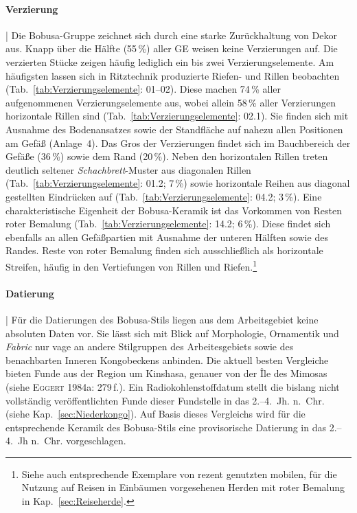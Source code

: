 \paragraph{Verzierung}\hspace{-.5em}|\hspace{.5em}%
Die Bobusa-Gruppe zeichnet sich durch eine starke Zurückhaltung von Dekor aus. Knapp über die Hälfte (55\,\%) aller GE weisen keine Verzierungen auf. Die verzierten Stücke zeigen häufig lediglich ein bis zwei Verzierungselemente. Am häufigsten lassen sich in Ritztechnik produzierte Riefen- und Rillen beobachten (Tab.~\ref{tab:Verzierungselemente}: 01--02). Diese machen 74\,\% aller aufgenommenen Verzierungselemente aus, wobei allein 58\,\% aller Verzierungen horizontale Rillen sind (Tab.~\ref{tab:Verzierungselemente}: 02.1). Sie finden sich mit Ausnahme des Bodenansatzes sowie der Standfläche auf nahezu allen Positionen am Gefäß (Anlage~4). Das Gros der Verzierungen findet sich im Bauchbereich der Gefäße (36\,\%) sowie dem Rand (20\,\%). Neben den horizontalen Rillen treten deutlich seltener \textit{Schachbrett}-Muster aus diagonalen Rillen (Tab.~\ref{tab:Verzierungselemente}: 01.2; 7\,\%) sowie horizontale Reihen aus diagonal gestellten Eindrücken auf (Tab.~\ref{tab:Verzierungselemente}: 04.2; 3\,\%). Eine charakteristische Eigenheit der Bobusa-Keramik ist das Vorkommen von Resten roter Bemalung (Tab.~\ref{tab:Verzierungselemente}: 14.2; 6\,\%). Diese findet sich ebenfalls an allen Gefäßpartien mit Ausnahme der unteren Hälften sowie des Randes. Reste von roter Bemalung finden sich ausschließlich als horizontale Streifen, häufig in den Vertiefungen von Rillen und Riefen.\footnote{Siehe auch entsprechende Exemplare von rezent genutzten mobilen, für die Nutzung auf Reisen in Einbäumen vorgesehenen Herden mit roter Bemalung in Kap.~\ref{sec:Reiseherde}.}

\paragraph{Datierung}\hspace{-.5em}|\hspace{.5em}%
Für die Datierungen des Bobusa-Stils liegen aus dem Arbeitsgebiet keine absoluten Daten vor. Sie lässt sich mit Blick auf Morphologie, Ornamentik und \textit{Fabric} nur vage an andere Stilgruppen des Arbeitesgebiets sowie des benachbarten Inneren Kongobeckens anbinden. Die aktuell besten Vergleiche bieten Funde aus der Region um Kinshasa, genauer von der Île des Mimosas (siehe \textsc{Eggert} 1984a: 279\,f.). Ein Radiokohlenstoffdatum stellt die bislang nicht vollständig veröffentlichten Funde dieser Fundstelle in das 2.--4.~Jh. n.~Chr. (siehe Kap.~\ref{sec:Niederkongo}). Auf Basis dieses Vergleichs wird für die entsprechende Keramik des Bobusa-Stils eine provisorische Datierung in das 2.--4.~Jh n.~Chr. vorgeschlagen.

